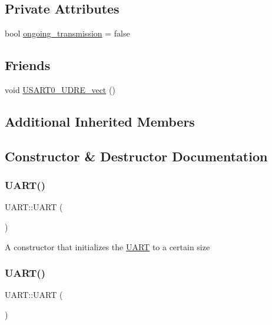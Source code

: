 \subsection*{Private Attributes}
\begin{DoxyCompactItemize}
\item 
bool \hyperlink{class_u_a_r_t_ae98e7d277a1833478aa85dc9e686150a}{ongoing\+\_\+transmission} = false
\end{DoxyCompactItemize}
\subsection*{Friends}
\begin{DoxyCompactItemize}
\item 
void \hyperlink{class_u_a_r_t_accc13d37cd82c841e387e1d5cf4d9a94}{U\+S\+A\+R\+T0\+\_\+\+U\+D\+R\+E\+\_\+vect} ()
\end{DoxyCompactItemize}
\subsection*{Additional Inherited Members}


\subsection{Constructor \& Destructor Documentation}
\hypertarget{class_u_a_r_t_a68e7e88d2a13f5da85f0fde1ef98515f}{}\label{class_u_a_r_t_a68e7e88d2a13f5da85f0fde1ef98515f} 
\subsubsection{\texorpdfstring{U\+A\+R\+T()}{UART()}\hspace{0.1cm}{\footnotesize\ttfamily [1/2]}}
{\footnotesize\ttfamily U\+A\+R\+T\+::\+U\+A\+RT (\begin{DoxyParamCaption}{ }\end{DoxyParamCaption})\hspace{0.3cm}{\ttfamily [private]}}

A constructor that initializes the \hyperlink{class_u_a_r_t}{U\+A\+RT} to a certain size \hypertarget{class_u_a_r_t_a97debffc29b178c09b104f4542298a36}{}\label{class_u_a_r_t_a97debffc29b178c09b104f4542298a36} 
\subsubsection{\texorpdfstring{U\+A\+R\+T()}{UART()}\hspace{0.1cm}{\footnotesize\ttfamily [2/2]}}
{\footnotesize\ttfamily U\+A\+R\+T\+::\+U\+A\+RT (\begin{DoxyParamCaption}\item[{const \hyperlink{class_u_a_r_t}{U\+A\+RT} \&}]{ }\end{DoxyParamCaption})\hspace{0.3cm}{\ttfamily [delete]}}


